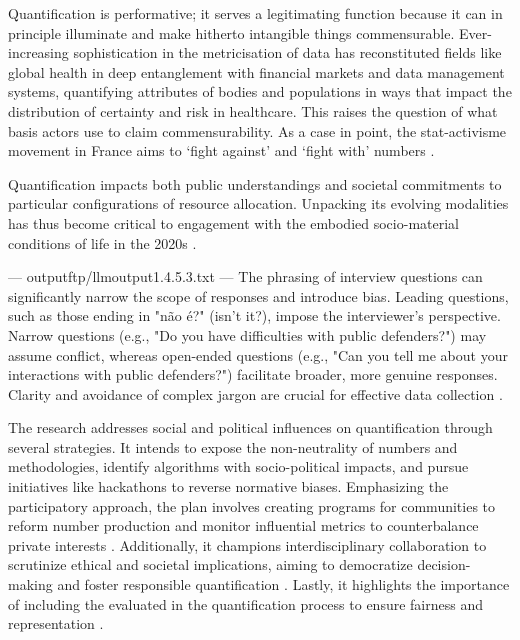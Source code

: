 Quantification is performative; it serves a legitimating function because it can in principle illuminate and make hitherto intangible things commensurable. Ever-increasing sophistication in the metricisation of data has reconstituted fields like global health in deep entanglement with financial markets and data management systems, quantifying attributes of bodies and populations in ways that impact the distribution of certainty and risk in healthcare. This raises the question of what basis actors use to claim commensurability. As a case in point, the stat-activisme movement in France aims to ‘fight against’ and ‘fight with’ numbers \cite{101057s4159902003965}.

Quantification impacts both public understandings and societal commitments to particular configurations of resource allocation. Unpacking its evolving modalities has thus become critical to engagement with the embodied socio-material conditions of life in the 2020s \cite{101057s4159902003965}.


---
outputftp/llmoutput1.4.5.3.txt
---
The phrasing of interview questions can significantly narrow the scope of responses and introduce bias. Leading questions, such as those ending in "não é?" (isn't it?), impose the interviewer’s perspective. Narrow questions (e.g., "Do you have difficulties with public defenders?") may assume conflict, whereas open-ended questions (e.g., "Can you tell me about your interactions with public defenders?") facilitate broader, more genuine responses. Clarity and avoidance of complex jargon are crucial for effective data collection \cite{machado2017}.

The research addresses social and political influences on quantification through several strategies. It intends to expose the non-neutrality of numbers and methodologies, identify algorithms with socio-political impacts, and pursue initiatives like hackathons to reverse normative biases. Emphasizing the participatory approach, the plan involves creating programs for communities to reform number production and monitor influential metrics to counterbalance private interests \cite{di2023}. Additionally, it champions interdisciplinary collaboration to scrutinize ethical and societal implications, aiming to democratize decision-making and foster responsible quantification \cite{sareen2020}. Lastly, it highlights the importance of including the evaluated in the quantification process to ensure fairness and representation \cite{salais2016}.

